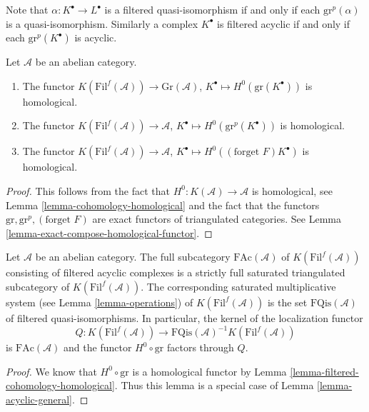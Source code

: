 \noindent
Note that $\alpha : K^\bullet \to L^\bullet$ is a filtered quasi-isomorphism
if and only if each $\text{gr}^p(\alpha)$ is a quasi-isomorphism. Similarly
a complex $K^\bullet$ is filtered acyclic if and only if each
$\text{gr}^p(K^\bullet)$ is acyclic.

\begin{lemma}
\label{lemma-filtered-cohomology-homological}
Let $\mathcal{A}$ be an abelian category.
\begin{enumerate}
\item The functor
$K(\text{Fil}^f(\mathcal{A})) \longrightarrow \text{Gr}(\mathcal{A})$,
$K^\bullet \longmapsto H^0(\text{gr}(K^\bullet))$
is homological.
\item The functor
$K(\text{Fil}^f(\mathcal{A})) \rightarrow \mathcal{A}$,
$K^\bullet \longmapsto H^0(\text{gr}^p(K^\bullet))$
is homological.
\item The functor
$K(\text{Fil}^f(\mathcal{A})) \longrightarrow \mathcal{A}$,
$K^\bullet \longmapsto H^0((\text{forget }F)K^\bullet)$
is homological.
\end{enumerate}
\end{lemma}

\begin{proof}
This follows from the fact that
$H^0 : K(\mathcal{A}) \to \mathcal{A}$ is homological, see
Lemma \ref{lemma-cohomology-homological}
and the fact that the functors $\text{gr}, \text{gr}^p, (\text{forget }F)$
are exact functors of triangulated categories. See
Lemma \ref{lemma-exact-compose-homological-functor}.
\end{proof}

\begin{lemma}
\label{lemma-filtered-acyclic}
Let $\mathcal{A}$ be an abelian category. The full subcategory
$\text{FAc}(\mathcal{A})$ of $K(\text{Fil}^f(\mathcal{A}))$
consisting of filtered acyclic complexes is a strictly full saturated
triangulated subcategory of $K(\text{Fil}^f(\mathcal{A}))$.
The corresponding saturated multiplicative system (see
Lemma \ref{lemma-operations})
of $K(\text{Fil}^f(\mathcal{A}))$ is the set
$\text{FQis}(\mathcal{A})$ of filtered quasi-isomorphisms.
In particular, the kernel of the localization
functor
$$
Q :
K(\text{Fil}^f(\mathcal{A}))
\longrightarrow
\text{FQis}(\mathcal{A})^{-1}K(\text{Fil}^f(\mathcal{A}))
$$
is $\text{FAc}(\mathcal{A})$ and the functor $H^0 \circ \text{gr}$
factors through $Q$.
\end{lemma}

\begin{proof}
We know that $H^0 \circ \text{gr}$ is a homological functor by
Lemma \ref{lemma-filtered-cohomology-homological}.
Thus this lemma is a special case of
Lemma \ref{lemma-acyclic-general}.
\end{proof}

